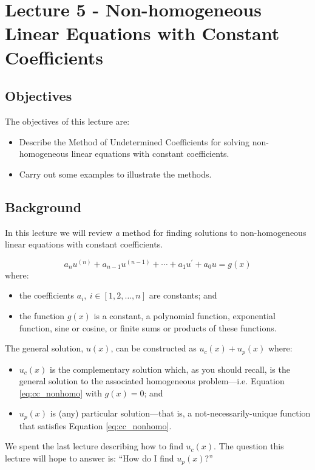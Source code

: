 \chapter{Lecture 5 - Non-homogeneous Linear Equations with Constant Coefficients}
\label{ch:lec5}
\section{Objectives}
The objectives of this lecture are:
\begin{itemize}
\item Describe the Method of Undetermined Coefficients for solving non-homogeneous linear equations with constant coefficients.
\item Carry out some examples to illustrate the methods.
\end{itemize}

\section{Background}
In this lecture we will review \emph{a} method for finding solutions to non-homogeneous linear equations with constant coefficients.

\begin{equation}
a_nu^{(n)} + a_{n-1}u^{(n-1)}+\cdots+a_1u^{\prime}+a_0u = g(x)
\label{eq:cc_nonhomo}
\end{equation}
where:
\begin{itemize}
\item the coefficients $a_i, \ i\in [1,2,\dots,n]$ are constants; and
\item the function $g(x)$ is a constant, a polynomial function, exponential function, sine or cosine, or finite sums or products of these functions.
\end{itemize}
The general solution, $u(x)$, can be constructed as $u_c(x)+u_p(x)$ where:
\begin{itemize}
\item $u_c(x)$ is the complementary solution which, as you should recall, is the general solution to the associated homogeneous problem---i.e. Equation \ref{eq:cc_nonhomo} with $g(x)=0$; and
\item $u_p(x)$ is (any) particular solution---that is, a not-necessarily-unique function that satisfies Equation \ref{eq:cc_nonhomo}.
\end{itemize}
We spent the last lecture describing how to find $u_c(x)$.  The question this lecture will hope to answer is: ``How do I find $u_p(x)$?''  
